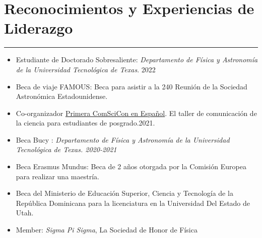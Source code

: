 \documentclass[letterpaper,10pt]{article}
\begin{document}
\section*{Reconocimientos y Experiencias de Liderazgo}       

\hrule
\vspace{.3 cm}

\begin{itemize}[label=$\blacktriangleright$]


\item Estudiante de Doctorado Sobresaliente: \emph{Departamento de F\'isica y Astronom\'ia de la Universidad Tecnol\'ogica de Texas}. 2022


\item Beca de viaje FAMOUS: Beca para asistir a la 240 Reuni\'on de la Sociedad Astron\'omica Estadounidense. 

\item Co-organizador \href{https://comscicon.com/comscicon-en-espanol-2021}{Primera ComSciCon en Espa\~nol}. El taller de comunicaci\'on de la ciencia para estudiantes de posgrado.2021.




\item Beca Bucy : \emph{Departamento de F\'isica y Astronom\'ia de la Universidad Tecnol\'ogica de Texas. 2020-2021} %





  \item Beca Erasmus Mundus: Beca de 2 a\~{n}os otorgada por la Comisi\'on Europea para realizar una maestr\'ia. %
  
\item Beca del Ministerio de Educaci\'on Superior, Ciencia y Tecnolog\'ia de la Rep\'ublica Dominicana para la licenciatura en la Universidad Del Estado de Utah.

  


\item  Member: \emph{Sigma Pi Sigma}, La Sociedad de Honor de F\'isica %


\end{itemize}
\end{document}
